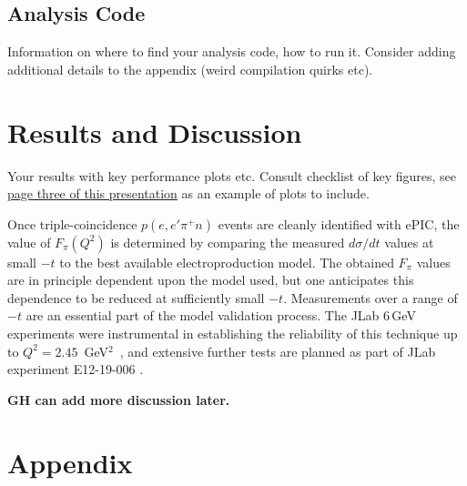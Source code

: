 \documentclass[letterpaper,12pt]{article}
\begin{document}
\subsection{Analysis Code}\label{subsec:Analysis_Code}

Information on where to find your analysis code, how to run it. Consider adding additional details to the appendix (weird compilation quirks etc).

\section{Results and Discussion}\label{sec:Results_Discuss}

Your results with key performance plots etc. Consult checklist of key figures, see \href{https://docs.google.com/presentation/d/1bqz9_GPvPoW4oz1m8KvzuUhPJZBe_CfU5APMt0LjfaU/edit?slide=id.g3338e3f4b69_0_51#slide=id.g3338e3f4b69_0_51}{page three of this presentation} as an example of plots to include.


Once triple-coincidence $p(e,e'\pi^+n)$ events are cleanly identified with ePIC,
the value of $F_{\pi}(Q^2)$ is determined by
comparing the measured $d\sigma/dt$ values at small $-t$ to the best
available electroproduction model.  The obtained $F_{\pi}$ values are in
principle dependent upon the model used, but one anticipates this dependence to
be reduced at sufficiently small $-t$.
Measurements over a range of $-t$ are an essential part of the model validation process.
The JLab 6\,GeV experiments were instrumental in establishing the reliability of this technique up to $Q^2=2.45$~GeV$^2$~\cite{Huber:2008id, Horn:2016rip, Horn:2007ug, Volmer:2000ek, Horn:2006tm, Tadevosyan:2007yd, Blok:2008jy, Huber:2014ius, Huber:2014kar}, and extensive further tests are planned as part of JLab experiment E12-19-006 \cite{E12-19-006}.

{\bf GH can add more discussion later.}

\pagebreak
\appendix
\section{Appendix}


 

\end{document}

